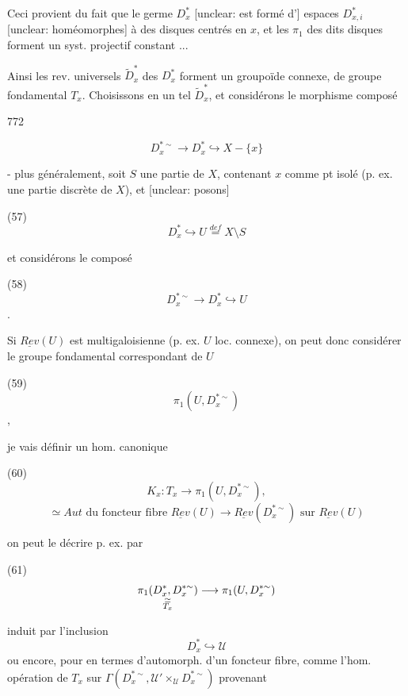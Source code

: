 Ceci provient du fait que le germe
$D^*_x$ [unclear: est formé d']
espaces $D^*_{x,i}$ [unclear: homéomorphes] à des disques
centrés en $x$, et les $\pi_1$ des dits
disques forment un syst. projectif
constant ...

Ainsi les rev. universels $\tilde{D}^*_x$ des
$D^*_x$ forment un groupoïde connexe,
de groupe fondamental $T_x$.
Choisissons en un tel $\tilde{D}^*_x$, et
considérons le morphisme composé

\newpage


772

$$D_x^{*\sim} \to D_x^* \hookrightarrow X - \{x\}$$

- plus généralement, soit $S$ une partie de $X$, contenant $x$ comme pt isolé (p. ex. une partie discrète de $X$), et [unclear: posons]

(57) $$D_x^* \hookrightarrow U \overset{def}{=} X \setminus S$$

et considérons le composé

(58) $$D_x^{*\sim} \to D_x^* \hookrightarrow U$$ .

Si $\underline{Rev}(U)$ est multigaloisienne (p. ex. $U$ loc. connexe), on peut donc considérer le groupe fondamental correspondant de $U$

(59) $$\pi_1(U, D_x^{*\sim})$$ ,

je vais définir un hom. canonique

(60) $$K_x : T_x \longrightarrow \pi_1(U, D_x^{*\sim}) ,$$
$$ \simeq Aut \text{ du foncteur fibre } \underline{Rev}(U) \to \underline{Rev}(D_x^{*\sim}) \text{ sur } \underline{Rev}(U)$$

on peut le décrire p. ex. par

(61) $$\underset{\begin{subarray}{c} \simeq \\ T_x \end{subarray}}{\pi_1(D_x^*, D_x^{*\sim})} \longrightarrow \pi_1(U, D_x^{*\sim})$$

\newpage


induit par l'inclusion
$$D_x^* \hookrightarrow \mathcal{U}$$
ou encore, pour en termes d'automorph. d'un
foncteur fibre, comme l'hom. opération de
$T_x$ sur $\Gamma(D_x^{*\sim}, \mathcal{U}' \times_\mathcal{U} D_x^{*\sim})$ provenant


